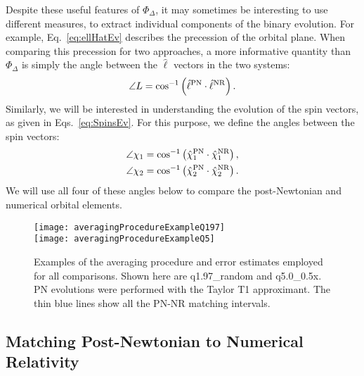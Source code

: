\documentclass[aps,prd,amsmath,floatfix,twocolumn,superscriptaddress,nofootinbib,showpacs]{revtex4-1}
\newcommand{\ellHat}{\ensuremath{\hat{\ell}}}
\begin{document}
Despite these useful features of $\Phi_{\Delta}$, it may sometimes be
interesting to use different measures, to extract individual
components of the binary evolution.  For example,
Eq.~\eqref{eq:ellHatEv} describes the precession of the orbital plane.
When comparing this precession for two approaches, a more informative
quantity than $\Phi_{\Delta}$ is simply the angle between the
$\ellHat$ vectors in the two systems:
\begin{equation}
  \label{eq:LAngle}
  \angle L = \cos^{-1}\left(\ellHat^{\rm PN}\cdot\ellHat^{\rm NR}\right).
\end{equation}
Similarly, we will be interested in understanding the evolution of the
spin vectors, as given in Eqs.~\eqref{eq:SpinsEv}.  For this purpose,
we define the angles between the spin vectors:
\begin{subequations}
  \label{eq:ChiAngles}
  \begin{align}
    \angle \chi_{1} &= \cos^{-1}\left(\hat{\chi}_{1}^{\rm PN}\cdot\hat{\chi}_{1}^{\rm NR}\right), \\
    \angle \chi_{2} &=
                      \cos^{-1}\left(\hat{\chi}_{2}^{\rm PN}\cdot\hat{\chi}_{2}^{\rm NR}\right).
  \end{align}
\end{subequations}
We will use all four of these angles below to compare the
post-Newtonian and numerical orbital elements.



\begin{figure}
  \texttt{[image: averagingProcedureExampleQ197]} \\[10pt]
  \texttt{[image: averagingProcedureExampleQ5]}
  \caption{Examples of the averaging procedure and error estimates
    employed for all comparisons. Shown here are q1.97\_random and
    q5.0\_0.5x. PN evolutions were performed with the Taylor T1
    approximant. The thin blue lines show all the PN-NR matching
    intervals. 
  \label{fig:avProcedure}
}
\end{figure}

\subsection{Matching Post-Newtonian to Numerical Relativity}
\label{sec:matching}
\end{document}
